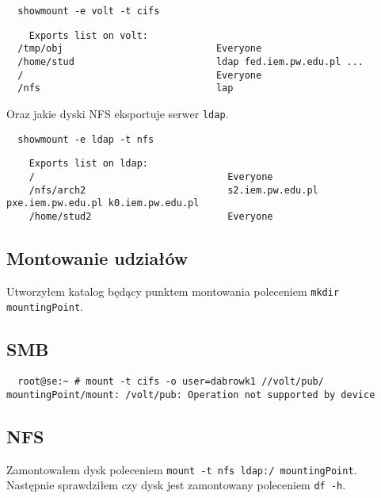 \documentclass{article} %
\begin{document}
\begin{tcolorbox}[colback=yellow!10!white,colframe=red!45!black,coltitle=yellow!100!black, title=FreeBSD]
  \begin{lstlisting}
  showmount -e volt -t cifs
  \end{lstlisting}
  \tcblower
  \tiny
  \begin{lstlisting}
    Exports list on volt:
  /tmp/obj                           Everyone
  /home/stud                         ldap fed.iem.pw.edu.pl ...
  /                                  Everyone
  /nfs                               lap
  \end{lstlisting}
\end{tcolorbox}
\normalsize

\vspace{1cm}
Oraz jakie dyski NFS eksportuje serwer \texttt{ldap}.
\begin{tcolorbox}[colback=yellow!10!white,colframe=red!45!black,coltitle=yellow!100!black, title=FreeBSD]
  \begin{lstlisting}
  showmount -e ldap -t nfs
  \end{lstlisting}
  \tcblower
  \tiny
  \begin{lstlisting}
    Exports list on ldap:
    /                                  Everyone
    /nfs/arch2                         s2.iem.pw.edu.pl pxe.iem.pw.edu.pl k0.iem.pw.edu.pl  
    /home/stud2                        Everyone
  \end{lstlisting}
\end{tcolorbox}
\normalsize

\subsection{Montowanie udziałów}
Utworzyłem katalog będący punktem montowania poleceniem \texttt{mkdir mountingPoint}.

\subsection{SMB}
\begin{verbatim}
  root@se:~ # mount -t cifs -o user=dabrowk1 //volt/pub/ mountingPoint/mount: /volt/pub: Operation not supported by device 
\end{verbatim}

\subsection{NFS}
Zamontowałem dysk poleceniem \texttt{mount -t nfs ldap:/ mountingPoint}. Następnie sprawdziłem czy dysk jest zamontowany poleceniem \texttt{df -h}.
\end{document}
